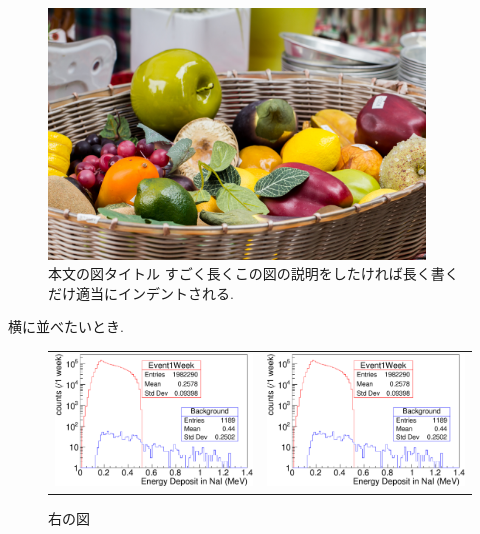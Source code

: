 \begin{figure}[tbp]
	\centering
	\includegraphics[width=10cm]{fig/image.jpg}
	\caption[ここが目次の図タイトル]{本文の図タイトル \newline すごく長くこの図の説明をしたければ長く書くだけ適当にインデントされる.}
	\label{fig:test2}
\end{figure}

横に並べたいとき.

\begin{figure}[tbp]
\begin{tabular}{cc}
\centering
\begin{minipage}{0.5\hsize}
	\includegraphics[width=7cm]{fig/figure.pdf}
	\caption{左の図}
	\label{fig:test3}
\end{minipage}&
\begin{minipage}{0.5\hsize}
	\includegraphics[width=7cm]{fig/figure.pdf}
	\caption{右の図}
	\label{fig:test4}
\end{minipage}

\end{tabular}
\end{figure}


